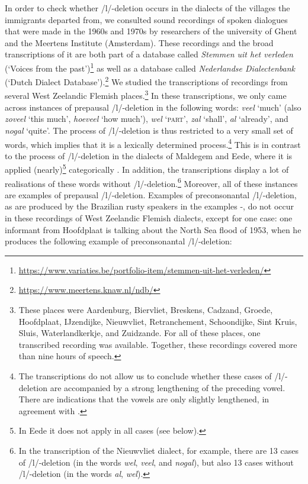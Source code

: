 \documentclass[output=paper,hidelinks,draftmode]{langscibook}
\begin{document}
\largerpage
In order to check whether /l/-deletion occurs in the dialects of the villages the immigrants departed from, we consulted sound recordings of spoken dialogues that were made in the 1960s and 1970s by researchers of the university of Ghent and the Meertens Institute (Amsterdam). These recordings and the broad transcriptions of it are both part of a database called \textit{Stemmen uit het verleden} (‘Voices from the past’)\footnote{ \url{https://www.variaties.be/portfolio-item/stemmen-uit-het-verleden/}} as well as a database called \textit{Nederlandse Dialectenbank} (‘Dutch Dialect Database’).\footnote{\url{https://www.meertens.knaw.nl/ndb/}} We studied the transcriptions of recordings from several West Zeelandic Flemish places.\footnote{These places were Aardenburg, Biervliet, Breskens, Cadzand, Groede, Hoofdplaat, IJzendijke, Nieuwvliet, Retranchement, Schoondijke, Sint Kruis, Sluis, Waterlandkerkje, and Zuidzande. For all of these places, one transcribed recording was available. Together, these recordings covered more than nine hours of speech.} In these transcriptions, we only came across instances of prepausal /l/-deletion in the following words: \textit{veel} ‘much’ (also \textit{zoveel} ‘this much’, \textit{hoeveel} ‘how much’), \textit{wel} ‘\textsc{part}’, \textit{zal} ‘shall’, \textit{al} ‘already’, and \textit{nogal} ‘quite’. The process of /l/-deletion is thus restricted to a very small set of words, which implies that it is a lexically determined process.\footnote{The transcriptions do not allow us to conclude whether these cases of /l/-deletion are accompanied by a strong lengthening of the preceding vowel. There are indications that the vowels are only slightly lengthened, in agreement with \citet{BroeckedeMan1978}.} This is in contrast to the process of /l/-deletion in the dialects of Maldegem and Eede, where it is applied (nearly)\footnote{In Eede it does not apply in all cases (see below).} categorically \citep{Versieck1989, Rys1999}. In addition, the transcriptions display a lot of realisations of these words without /l/-deletion.\footnote{ {In the transcription of the Nieuwvliet dialect, for example, there are 13 cases of /l/-deletion (in the words} {\textit{wel}}, {\textit{veel}}{, and} {\textit{nogal}}{), but also 13 cases without /l/-deletion (in the words} {\textit{al}}, {\textit{wel}}).} Moreover, all of these instances are examples of prepausal /l/-deletion. Examples of preconsonantal /l/-deletion, as are produced by the Brazilian rusty speakers in the examples -, do not occur in these recordings of West Zeelandic Flemish dialects, except for one case: one informant from Hoofdplaat is talking about the North Sea flood of 1953, when he produces the following example of preconsonantal /l/-deletion:
\end{document}
